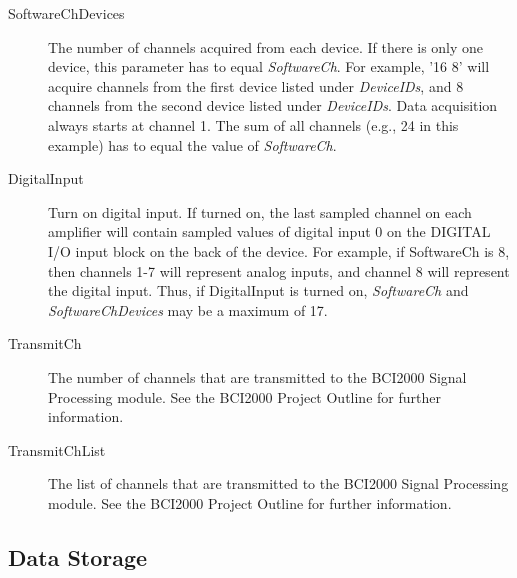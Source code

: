 \documentclass[letterpaper, oneside, 12pt]{article}
\begin{document}
\begin{description}
 \item [SoftwareChDevices] The number of channels acquired from each device. 
                           If there is only one device, this parameter has to equal \textit{SoftwareCh}.
                           For example, '16 8' will acquire channels from the 
                           first device listed under \textit{DeviceIDs}, and 8 channels
                           from the second device listed under \textit{DeviceIDs}.
                           Data acquisition always starts at channel 1.
                           The sum of all channels (e.g., 24 in this example) has to 
                           equal the value of \textit{SoftwareCh}.
 \item [DigitalInput]      Turn on digital input. If turned on, the last sampled channel
                           on each amplifier will contain sampled values of  
                           digital input 0 on the DIGITAL I/O input block on the 
                           back of the device. For example, if SoftwareCh is 8, then
                           channels 1-7 will represent analog inputs, and channel 8 will
                           represent the digital input. Thus, if DigitalInput is turned on,
                           \textit{SoftwareCh} and \textit{SoftwareChDevices}
                           may be a maximum of 17.
 \item [TransmitCh]        The number of channels that are transmitted to the BCI2000 
                           Signal Processing module. See the BCI2000 Project
                           Outline for further information.
 \item [TransmitChList]    The list of channels that are transmitted to the BCI2000 
                           Signal Processing module. See the BCI2000 Project
                           Outline for further information.                                                                        
\end{description}


\subsection{Data Storage}
\end{document}
